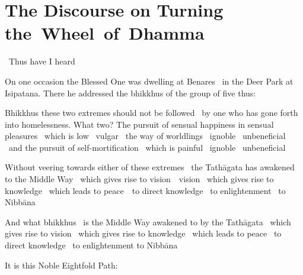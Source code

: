 
\section{The Discourse on Turning \mbox{the}~Wheel~of~Dhamma}
\label{wheel-of-dhamma-full}

\begin{leader-english}
  \anglebracketleft\ \hspace{-0.5mm}Thus have I heard \hspace{-0.5mm}\anglebracketright\
\end{leader-english}

\begin{english-only-hang}
  On one occasion the Blessed One was dwelling at Benares \breathmark\ in the Deer Park at Isipatana. There he addressed the bhikkhus of the group of five thus:
\end{english-only-hang}

\begin{english-only-hang}
  Bhikkhus these two extremes should not be followed \breathmark\ by one who has gone forth into homelessness. What two? The pursuit of sensual happiness in sensual pleasures \breathmark\ which is low \breathmark\ vulgar \breathmark\ the way of worldlings \breathmark\ ignoble \breathmark\ unbeneficial \breathmark\ and the pursuit of self-mortification \breathmark\ which is painful \breathmark\ ignoble \breathmark\ unbeneficial
\end{english-only-hang}

\begin{english-only-hang}
  Without veering towards either of these extremes \breathmark\ the Tathāgata has awakened to the Middle Way \breathmark\ which gives rise to \ifbfiveversion \mbox{vision}~\breathmark\ \else vision \breathmark\ \fi which gives rise to knowledge \breathmark\ which leads to \mbox{peace}~\breathmark\ to direct knowledge \breathmark\ to enlightenment \breathmark\ to Nibbāna
\end{english-only-hang}

\begin{english-only-hang}
  And what bhikkhus \breathmark\ is the Middle Way awakened to by the Tathāgata \breathmark\ which gives rise to vision \breathmark\ which gives rise to knowledge \breathmark\  which leads to peace \breathmark\ to direct knowledge \breathmark\ to enlightenment to Nibbāna
\end{english-only-hang}

\begin{english-only-hang}
  It is this Noble Eightfold Path:
\end{english-only-hang}

